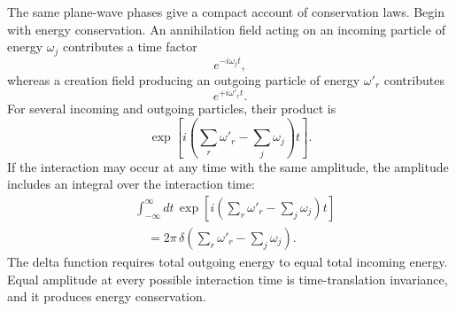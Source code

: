 The same plane-wave phases give a compact account of conservation laws. Begin with energy conservation. An annihilation field acting on an incoming particle of energy \(\omega_j\) contributes a time factor
\begin{equation}
e^{-i\omega_j t},
\end{equation}
whereas a creation field producing an outgoing particle of energy \(\omega'_r\) contributes
\begin{equation}
e^{+i\omega'_r t}.
\end{equation}
For several incoming and outgoing particles, their product is
\begin{equation}
\exp\!\left[
i\left(\sum_r\omega'_r-\sum_j\omega_j\right)t
\right].
\end{equation}
If the interaction may occur at any time with the same amplitude, the amplitude includes an integral over the interaction time:
\begin{equation}
\begin{aligned}
&\int_{-\infty}^{\infty}dt\,
\exp\!\left[
i\left(\sum_r\omega'_r-\sum_j\omega_j\right)t
\right]
\\
&\quad =2\pi\,
\delta\!\left(\sum_r\omega'_r-\sum_j\omega_j\right).
\end{aligned}
\end{equation}
The delta function requires total outgoing energy to equal total incoming energy. Equal amplitude at every possible interaction time is time-translation invariance, and it produces energy conservation.

